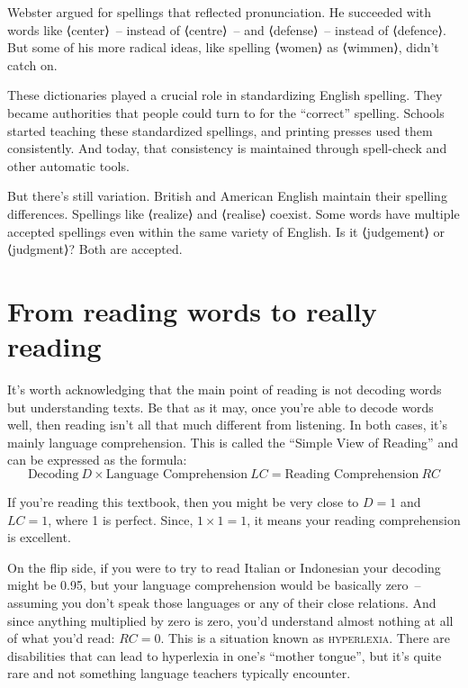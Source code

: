 Webster argued for spellings that reflected pronunciation. He succeeded with words like ⟨center⟩~-- instead of ⟨centre⟩~-- and ⟨defense⟩~-- instead of ⟨defence⟩. But some of his more radical ideas, like spelling ⟨women⟩ as ⟨wimmen⟩, didn't catch on.

These dictionaries played a crucial role in standardizing English spelling. They became authorities that people could turn to for the ``correct'' spelling. Schools started teaching these standardized spellings, and printing presses used them consistently. And today, that consistency is maintained through spell-check and other automatic tools.

But there's still variation. British and American English maintain their spelling differences. Spellings like ⟨realize⟩ and ⟨realise⟩ coexist. Some words have multiple accepted spellings even within the same variety of English. Is it ⟨judgement⟩ or ⟨judgment⟩? Both are accepted.

\section{From reading words to really reading}

It's worth acknowledging that the main point of reading is not decoding words but understanding texts. Be that as it may, once you're able to decode words well, then reading isn't all that much different from listening. In both cases, it's mainly language comprehension. This is called the ``Simple View of Reading'' and can be expressed as the formula:
\[
\text{Decoding}~D \times \text{Language Comprehension}~LC = \text{Reading Comprehension}~RC
\]

If you're reading this textbook, then you might be very close to $D=1$ and $LC=1$, where 1 is perfect. Since, $1\times1=1$, it means your reading comprehension is excellent. 

On the flip side, if you were to try to read Italian or Indonesian  your decoding might be 0.95, but your language comprehension would be basically zero~-- assuming you don't speak those languages or any of their close relations. And since anything multiplied by zero is zero, you'd understand almost nothing at all of what you'd read: $RC=0$. This is a situation known as \textsc{hyperlexia}. There are disabilities that can lead to hyperlexia in one's ``mother tongue'', but it's quite rare and not something language teachers typically encounter.

